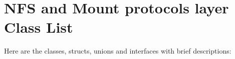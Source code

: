 \section{NFS and Mount protocols layer Class List}
Here are the classes, structs, unions and interfaces with brief descriptions:\begin{CompactList}
\item{}
\item{}
\end{CompactList}
